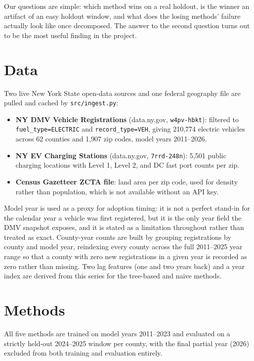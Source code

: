 \documentclass{article}
\begin{document}
Our questions are simple: which method wins on a real holdout, is the winner an
artifact of an easy holdout window, and what does the losing methods' failure actually
look like once decomposed. The answer to the second question turns out to be the most
useful finding in the project.

\section{Data}
Two live New York State open-data sources and one federal geography file are pulled
and cached by \texttt{src/ingest.py}:

\begin{itemize}
\setlength\itemsep{0.2em}
\item \textbf{NY DMV Vehicle Registrations} (data.ny.gov, \texttt{w4pv-hbkt}): filtered
to \texttt{fuel\_type=ELECTRIC} and \texttt{record\_type=VEH}, giving 210{,}774
electric vehicles across 62 counties and 1{,}907 zip codes, model years 2011--2026.
\item \textbf{NY EV Charging Stations} (data.ny.gov, \texttt{7rrd-248n}): 5{,}501
public charging locations with Level 1, Level 2, and DC fast port counts per zip.
\item \textbf{Census Gazetteer ZCTA file}: land area per zip code, used for density
rather than population, which is not available without an API key.
\end{itemize}

Model year is used as a proxy for adoption timing: it is not a perfect stand-in for the
calendar year a vehicle was first registered, but it is the only year field the DMV
snapshot exposes, and it is stated as a limitation throughout rather than treated as
exact. County-year counts are built by grouping registrations by county and model
year, reindexing every county across the full 2011--2025 year range so that a county
with zero new registrations in a given year is recorded as zero rather than missing.
Two lag features (one and two years back) and a year index are derived from this
series for the tree-based and naive methods.

\section{Methods}
All five methods are trained on model years 2011--2023 and evaluated on a strictly
held-out 2024--2025 window per county, with the final partial year (2026) excluded
from both training and evaluation entirely.
\end{document}
